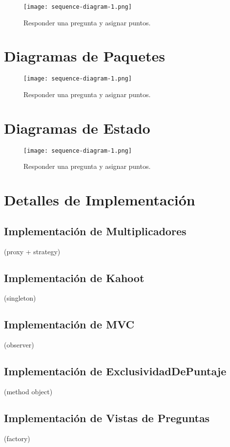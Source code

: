 \documentclass[titlepage,a4paper]{article}
\begin{document}
\begin{figure}[H]
\centering
\texttt{[image: sequence-diagram-1.png]}
\caption{\label{fig:seq01}Responder una pregunta y asignar puntos.}
\end{figure}


\section{Diagramas de Paquetes}\label{sec:diagramasdepaquetes}

\begin{figure}[H]
\centering
\texttt{[image: sequence-diagram-1.png]}
\caption{\label{fig:seq01}Responder una pregunta y asignar puntos.}
\end{figure}


\section{Diagramas de Estado}\label{sec:diagramasdeestado}

\begin{figure}[H]
\centering
\texttt{[image: sequence-diagram-1.png]}
\caption{\label{fig:seq01}Responder una pregunta y asignar puntos.}
\end{figure}


\section{Detalles de Implementación}\label{sec:detallesdeimplementacion}

\subsection{Implementación de Multiplicadores} (proxy + strategy)
\subsection{Implementación de Kahoot} (singleton)
\subsection{Implementación de MVC} (observer)
\subsection{Implementación de ExclusividadDePuntaje} (method object)
\subsection{Implementación de Vistas de Preguntas} (factory)
\end{document}
